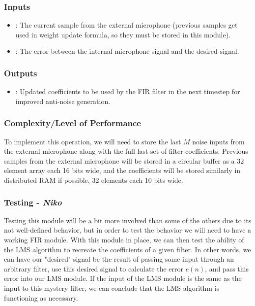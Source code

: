 \documentclass{fpgairpods}
\begin{document}
\subsubsection{Inputs}
\begin{itemize}
    \item {}: The current sample from the external microphone (previous samples get used in weight update formula, so they must be stored in this module).
    \item {}: The error between the internal microphone signal and the desired signal.
\end{itemize}
\subsubsection{Outputs}
\begin{itemize}
    \item {}: Updated coefficients to be used by the FIR filter in the next timestep for improved anti-noise generation.
\end{itemize}
\subsubsection{Complexity/Level of Performance}
To implement this operation, we will need to store the last $M$ noise inputs from the external microphone along with the full last set of filter coefficients. Previous samples from the external microphone will be stored in a circular buffer as a 32 element array each 16 bits wide, and the coefficients will be stored similarly in distributed RAM if possible, 32 elements each 10 bits wide.

\subsubsection{Testing - \textit{Niko}}
Testing this module will be a bit more involved than some of the others due to its not well-defined behavior, but in order to test the behavior we will need to have a working FIR module. With this module in place, we can then test the ability of the LMS algorithm to recreate the coefficients of a given filter. In other words, we can have our "desired" signal be the result of passing some input through an arbitrary filter, use this desired signal to calculate the error $e(n)$, and pass this error into our LMS module. If the input of the LMS module is the same as the input to this mystery filter, we can conclude that the LMS algorithm is functioning as necessary.
\end{document}
